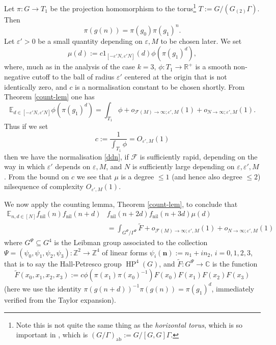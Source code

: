 \documentclass[11pt,reqno]{amsart}
\numberwithin{equation}{section}
\theoremstyle{plain}
\theoremstyle{definition}
\renewcommand{\leq}{\leqslant}
\newcommand\E{{\mathbb{E}}}
\newcommand\Z{\mathbb{Z}}
\newcommand\R{\mathbb{R}}
\newcommand\C{\mathbb{C}}
\newcommand\ab{\operatorname{ab}}
\newcommand\1{{\bf 1}}
\newcommand\2{{\bf 2}}
\newcommand\eps{\varepsilon}
\newcommand\HP{\operatorname{HP}}
\newcommand\nil{{\operatorname{nil}}}
\newcommand\Grow{{\mathcal F}}
\begin{document}
Let $\pi: G \to T_1$ be the projection homomorphism to the torus\footnote{Note this is not quite the same thing as the \emph{horizontal torus}, which is so important in \cite{green-tao-nilratner}, which is $(G/\Gamma)_{\ab} := G/[G,G]\Gamma$.} $T:= G/(G_{(2)} \Gamma)$. Then
$$ \pi(g(n)) = \pi(g_0) \pi(g_1)^n.$$
Let $\eps' > 0$ be a small quantity depending on $\eps, M$ to be chosen later.  We set 
$$ \mu(d) := c 1_{[-\eps'N,\eps'N]}(d) \phi(\pi(g_1)^d),$$
where, much as in the analysis of the case $k = 3$, $\phi: T_1 \to \R^+$ is a smooth non-negative cutoff to the ball of radius $\eps'$ centered at the origin that is not identically zero, and $c$ is a normalisation constant to be chosen shortly.  From Theorem \ref{count-lem} one has
$$ \E_{d \in [-\eps'N,\eps'N]} \phi(\pi(g_1)^d) = \int_{T_1} \phi + o_{\Grow(M) \to \infty; \eps',M}(1)
+ o_{N \to \infty; \eps',M}(1).$$
Thus if we set
\begin{equation}\label{ctp}
 c := \frac{1}{\int_{T_1} \phi} = O_{\eps',M}(1)
 \end{equation}
then we have the normalisation \eqref{ddn}, if $\Grow$ is sufficiently rapid, depending on the way in which $\eps'$ depends on $\eps,M$, and $N$ is sufficiently large depending on $\eps,\eps',M$.
From the bound on $c$ we see that $\mu$ is a degree $\leq 1$ (and hence also degree $\leq 2$) nilsequence of complexity $O_{\eps',M}(1)$.

We now apply the counting lemma, Theorem \ref{count-lem}, to conclude that
\begin{align}\nonumber 
\E_{n,d \in [N]} f_\nil(n) f_\nil(n+d)&  f_\nil(n+2d) f_\nil(n+3d)\mu(d) \\ & = \int_{G^{\Psi}/\Gamma^{\Psi}} \tilde F + o_{\Grow(M) \to \infty; \eps',M}(1) + o_{N \to \infty; \eps',M}(1) \label{counting}
\end{align}
where $G^{\Psi} \subseteq G^4$ is the Leibman group associated to the collection $\Psi = (\psi_0,\psi_1,\psi_2,\psi_3): \Z^2 \to \Z^4$ of linear forms $\psi_i(\mathbf{n}) := n_1 + i n_2$, $i = 0,1,2,3$, that is to say the Hall-Petresco group $\HP^4(G)$, and $\tilde F: G^{\Psi} \to \C$ is the function
$$ \tilde F( x_0, x_1, x_2, x_3 ) := c \phi(\pi(x_1) \pi(x_0)^{-1}) F(x_0) F(x_1) F(x_2) F(x_3)$$
(here we use the identity $\pi(g(n+d))^{-1} \pi(g(n)) = \pi(g_1)^d$, immediately verified from the Taylor expansion).  
\end{document}
